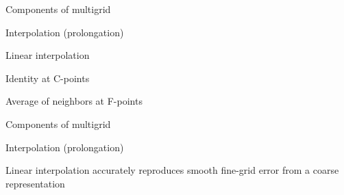 \documentclass[18pt,xcolor=table]{beamer}
\begin{document}
\begin{frame}{Components of multigrid}
\begin{block}{Interpolation (prolongation)}
\bit
\item Linear interpolation
\item Identity at C-points
\item Average of neighbors at F-points
\eit
\end{block}
\end{frame}

\begin{frame}{Components of multigrid}
\begin{block}{Interpolation (prolongation)}
\bit
\item Linear interpolation accurately reproduces smooth fine-grid error from a coarse representation
\eit
\end{block}
\end{frame}
\end{document}
